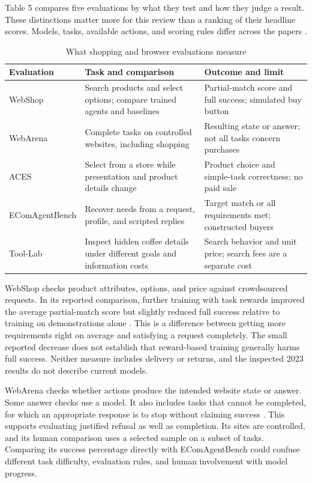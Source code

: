 \documentclass{article}
\begin{document}
Table 5 compares five evaluations by what they test and how they judge a result. These distinctions matter more for this review than a ranking of their headline scores. Models, tasks, available actions, and scoring rules differ across the papers \cite{ref17,ref18,ref19,ref33,ref34}.

\begin{table}[H]
\centering
\caption{What shopping and browser evaluations measure}
\footnotesize
\begin{tabularx}{\textwidth}{@{}>{\raggedright\arraybackslash}X>{\raggedright\arraybackslash}X>{\raggedright\arraybackslash}X@{}}
\toprule
\textbf{Evaluation} & \textbf{Task and comparison} & \textbf{Outcome and limit} \\
\midrule
WebShop \cite{ref33} & Search products and select options; compare trained agents and baselines & Partial-match score and full success; simulated buy button \\[3pt]
WebArena \cite{ref34} & Complete tasks on controlled websites, including shopping & Resulting state or answer; not all tasks concern purchases \\[3pt]
ACES \cite{ref17} & Select from a store while presentation and product details change & Product choice and simple-task correctness; no paid sale \\[3pt]
EComAgentBench \cite{ref18} & Recover needs from a request, profile, and scripted replies & Target match or all requirements met; constructed buyers \\[3pt]
Tool-Lab \cite{ref19} & Inspect hidden coffee details under different goals and information costs & Search behavior and unit price; search fees are a separate cost \\[3pt]
\bottomrule
\end{tabularx}
\end{table}

WebShop checks product attributes, options, and price against crowdsourced requests. In its reported comparison, further training with task rewards improved the average partial-match score but slightly reduced full success relative to training on demonstrations alone \cite{ref33}. This is a difference between getting more requirements right on average and satisfying a request completely. The small reported decrease does not establish that reward-based training generally harms full success. Neither measure includes delivery or returns, and the inspected 2023 results do not describe current models.

WebArena checks whether actions produce the intended website state or answer. Some answer checks use a model. It also includes tasks that cannot be completed, for which an appropriate response is to stop without claiming success \cite{ref34}. This supports evaluating justified refusal as well as completion. Its sites are controlled, and its human comparison uses a selected sample on a subset of tasks. Comparing its success percentage directly with EComAgentBench could confuse different task difficulty, evaluation rules, and human involvement with model progress.
\end{document}
